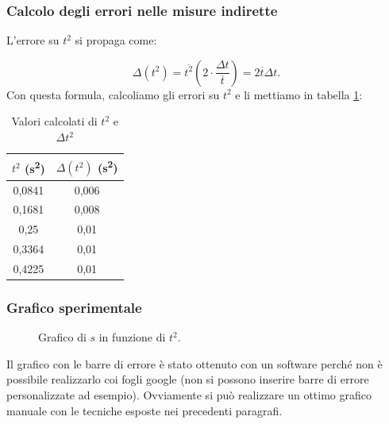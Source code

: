 \subsubsection{Calcolo degli errori nelle misure indirette}
L'errore su $t^2$ si propaga come:

\begin{equation}
    \Delta(t^2) =\overline{t^2} \left(2\cdot\frac{\Delta t}{\overline{t}}  \right)= 2\overline{t}\Delta t.
\end{equation}
Con questa formula, calcoliamo gli errori su $t^2$ e li mettiamo in tabella \ref{tab:tquadro}:

\begin{table}[h!]
\centering
\begin{tabular}{|c|c|}
\hline
$t^2$ (\si{\second\squared}) & $\Delta \left( t^2 \right)$ (\si{\second\squared}) \\
\hline
0,0841 & 0,006 \\
0,1681 & 0,008 \\
0,25   & 0,01   \\
0,3364 & 0,01 \\
0,4225 & 0,01  \\
\hline
\end{tabular}
\caption{Valori calcolati di $t^2$ e $\Delta t^2$}
\label{tab:tquadro}
\end{table}

\subsubsection{Grafico sperimentale}

\begin{figure}[!htbp]
    \centering
    \caption{Grafico di $s$ in funzione di $t^2$.}
    \label{fig:grafico-moto}
\end{figure}
Il grafico con le barre di errore è stato ottenuto con un software perché non è possibile realizzarlo coi fogli google (non si possono inserire barre di errore personalizzate ad esempio). Ovviamente si può realizzare un ottimo grafico manuale con le tecniche esposte nei precedenti paragrafi.
